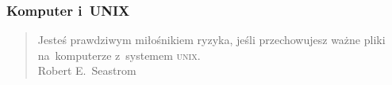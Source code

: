 \documentclass[10pt,t]{beamer}
\begin{document}
\begin{frame}
  \frametitle{Komputer i~UNIX}


























  \begin{quote}

    Jesteś prawdziwym miłośnikiem ryzyka, jeśli przechowujesz ważne pliki
    na~komputerze z~systemem \textsc{unix}. \\
    Robert E.~Seastrom

  \end{quote}

\end{frame}
\end{document}

